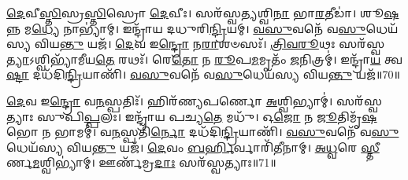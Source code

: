 \-\ul{𑌦𑍇}\-𑌵𑍀\-\ul{𑌸𑍍𑌤𑌿}\-𑌸𑍍𑌰\-\ul{𑌸𑍍𑌤𑌿}\-𑌸𑍍𑌰𑍋 \ul{𑌦𑍇}\-𑌵𑍀𑌃।
𑌸𑌰᳴𑌸𑍍𑌵\-\ul{𑌤𑍍𑌯}\-𑌶𑍍𑌵𑌿\-\ul{𑌨𑌾} 𑌭𑌾\-\ul{𑌰}\-𑌤𑍀𑌡𑌾॑।
𑌶𑍂\-\ul{𑌷}\-𑌨𑍍𑌨 𑌮\-\ul{𑌧𑍍𑌯𑍇} 𑌨𑌾𑌭𑍍𑌯𑌾॑𑌮𑍍।
𑌇𑌨𑍍𑌦𑍍𑌰𑌾᳴𑌯 𑌦𑌧𑍁𑌰𑌿\-\ul{𑌨𑍍𑌦𑍍𑌰𑌿}\-𑌯𑌮𑍍।
\-\ul{𑌵}\-\-\ul{𑌸𑍁}\-𑌵𑌨𑍇᳴ 𑌵\-\ul{𑌸𑍁}\-𑌧𑍇𑌯᳴𑌸𑍍𑌯 𑌵𑌿𑌯\-\ul{𑌨𑍍𑌤𑍁} 𑌯𑌜᳴।
\-\ul{𑌦𑍇}\-𑌵 𑌇\-\ul{𑌨𑍍𑌦𑍍𑌰𑍋} 𑌨\-\ul{𑌰𑌾}\-𑌶𑍞𑌸𑌃᳴।
\-\ul{𑌤𑍍𑌰𑌿}\-\-\ul{𑌵}\-\-\ul{𑌰𑍂}\-𑌥𑌃 𑌸𑌰᳴𑌸𑍍𑌵\-\ul{𑌤𑍍𑌯𑌾}\-\-𑌽𑌶𑍍𑌵𑌿𑌭𑍍𑌯𑌾᳴𑌮𑍀𑌯\-\ul{𑌤𑍇} 𑌰𑌥𑌃᳴।
𑌰𑍇\-\ul{𑌤𑍋} 𑌨 \ul{𑌰𑍂}\-𑌪\-\ul{𑌮}\-𑌮𑍃𑌤𑌂᳴ \ul{𑌜}\-𑌨𑌿𑌤𑍍𑌰𑌮𑍍॑।
𑌇𑌨𑍍𑌦𑍍𑌰𑌾᳴\-\ul{𑌯} 𑌤𑍍𑌵\-\ul{𑌷𑍍𑌟𑌾} 𑌦𑌧᳴𑌦𑌿\-\ul{𑌨𑍍𑌦𑍍𑌰𑌿}\-𑌯𑌾𑌣𑌿᳴।
\-\ul{𑌵}\-\-\ul{𑌸𑍁}\-𑌵𑌨𑍇᳴ 𑌵\-\ul{𑌸𑍁}\-𑌧𑍇𑌯᳴𑌸𑍍𑌯 𑌵𑌿𑌯\-\ul{𑌨𑍍𑌤𑍁} 𑌯𑌜᳴॥70॥

\-\ul{𑌦𑍇}\-𑌵 𑌇\-\ul{𑌨𑍍𑌦𑍍𑌰𑍋} 𑌵\-\ul{𑌨}\-𑌸𑍍𑌪𑌤𑌿𑌃᳴।
𑌹𑌿𑌰᳴𑌣𑍍𑌯𑌪𑌰𑍍𑌣𑍋 \ul{𑌅}\-𑌶𑍍𑌵𑌿𑌭𑍍𑌯𑌾𑌮𑍍॑।
𑌸𑌰᳴𑌸𑍍𑌵𑌤𑍍𑌯𑌾𑌃 𑌸𑍁𑌪𑌿\-\ul{𑌪𑍍𑌪}\-𑌲𑌃।
𑌇𑌨𑍍𑌦𑍍𑌰𑌾᳴𑌯 𑌪𑌚𑍍𑌯\-\ul{𑌤𑍇} 𑌮𑌧𑍁᳴।
𑌓\-\ul{𑌜𑍋} 𑌨 \ul{𑌜𑍂}\-𑌤𑌿𑌮𑍃᳴\-\ul{𑌷}\-𑌭𑍋 𑌨 𑌭𑌾𑌮𑌮𑍍॑।
𑌵\-\ul{𑌨}\-𑌸𑍍𑌪𑌤𑌿᳴\-\ul{𑌰𑍍𑌨𑍋} 𑌦𑌧᳴𑌦𑌿\-\ul{𑌨𑍍𑌦𑍍𑌰𑌿}\-𑌯𑌾𑌣𑌿᳴।
\-\ul{𑌵}\-\-\ul{𑌸𑍁}\-𑌵𑌨𑍇᳴ 𑌵\-\ul{𑌸𑍁}\-𑌧𑍇𑌯᳴𑌸𑍍𑌯 𑌵𑌿𑌯\-\ul{𑌨𑍍𑌤𑍁} 𑌯𑌜᳴।
\-\ul{𑌦𑍇}\-𑌵𑌂 \ul{𑌬}\-\-\ul{𑌰𑍍}\-𑌹𑌿𑌰𑍍𑌵𑌾𑌰𑌿᳴𑌤𑍀𑌨𑌾𑌮𑍍।
\-\ul{𑌅}\-\-\ul{𑌧𑍍𑌵}\-𑌰𑍇 \ul{𑌸𑍍𑌤𑍀}\-𑌰𑍍𑌣\-\ul{𑌮}\-𑌶𑍍𑌵𑌿𑌭𑍍𑌯𑌾॑𑌮𑍍।
𑌊𑌰𑍍𑌣᳴𑌮𑍍𑌰\-\ul{𑌦𑌾𑌃} 𑌸𑌰᳴𑌸𑍍𑌵𑌤𑍍𑌯𑌾𑌃॥71॥

